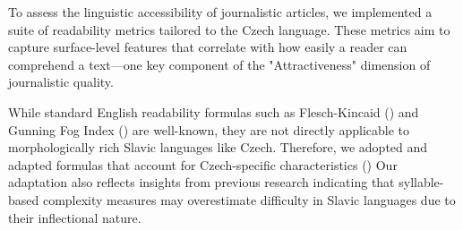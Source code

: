 


To assess the linguistic accessibility of journalistic articles, we implemented a suite of readability metrics tailored to the Czech language. These metrics aim to capture surface-level features that correlate with how easily a reader can comprehend a text—one key component of the "Attractiveness" dimension of journalistic quality.

While standard English readability formulas such as Flesch-Kincaid (\cite{flesch2007flesch}) and Gunning Fog Index (\cite{gunning1969fog}) are well-known, they are not directly applicable to morphologically rich Slavic languages like Czech. Therefore, we adopted and adapted formulas that account for Czech-specific characteristics (\cite{inbook}) Our adaptation also reflects insights from previous research indicating that syllable-based complexity measures may overestimate difficulty in Slavic languages due to their inflectional nature.

